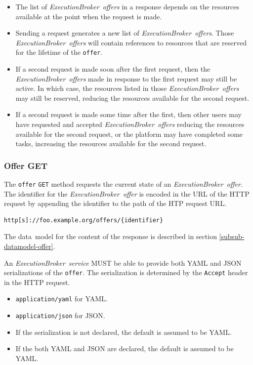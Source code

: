 \documentclass[11pt,a4paper]{ivoa}
\newcommand{\json} {JSON}
\newcommand{\yaml} {YAML}
\newcommand{\datamodel} {data~model}
\newcommand{\execbrokerservice}[1] {\textit{ExecutionBroker~service#1}}
\newcommand{\execoffer}[1] {\textit{ExecutionBroker~offer#1}}
\newcommand{\codeword}[1] {\texttt{#1}}
\begin{document}
\begin{itemize}
    \item The list of \execoffer{s} in a response depends on the resources available at the point when the request is made.
    \item Sending a request generates a new list of \execoffer{s}.
    Those \execoffer{s} will contain references to resources that are reserved for the lifetime of the \codeword{offer}.
    \item If a second request is made soon after the first request,
    then the \execoffer{s} made in response to the first request may still be active.
    In which case, the resources listed in those \execoffer{s} may still be reserved,
    reducing the resources available for the second request.
    \item If a second request is made some time after the first, then
    other users may have requested and accepted \execoffer{s} reducing the resources available for the second request,
    or the platform may have completed some tasks, increasing the resources available for the second request.
\end{itemize}

\subsubsection{Offer GET}
\label{subsub-execution-planner-offer-get}

The \codeword{offer} \codeword{GET} method requests the current state of an \execoffer{}.
The identifier for the \execoffer{} is encoded in the URL of the HTTP request by appending the
identifier to the path of the HTP request URL.

\begin{lstlisting}[]
http[s]://foo.example.org/offers/{identifier}
\end{lstlisting}

The \datamodel{} for the content of the response is described in section
\ref{subsub-datamodel-offer}.

An \execbrokerservice{} MUST be able to provide both \yaml{} and \json{} serializations
of the \codeword{offer}.
The serialization is determined by the \codeword{Accept} header in the HTTP request.
\begin{itemize}
    \item \codeword{application/yaml} for \yaml{}.
    \item \codeword{application/json} for \json{}.
    \item If the serialization is not declared, the default is assumed to be \yaml{}.
    \item If the both \yaml{} and \json{} are declared, the default is assumed to be \yaml{}.
\end{itemize}
\end{document}
